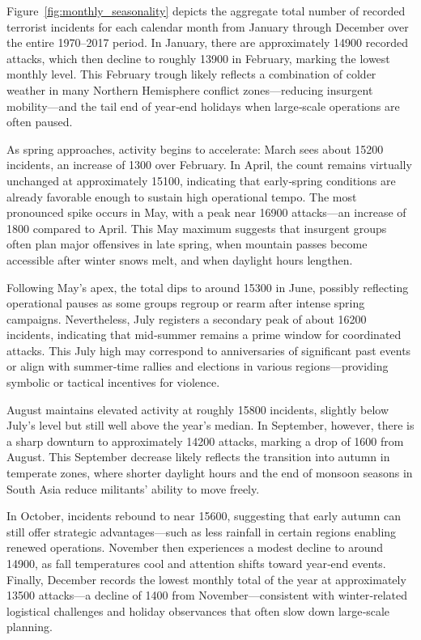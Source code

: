 Figure~\ref{fig:monthly_seasonality} depicts the aggregate total number of recorded terrorist incidents for each calendar month from January through December over the entire 1970–2017 period. In January, there are approximately 14900 recorded attacks, which then decline to roughly 13900 in February, marking the lowest monthly level. This February trough likely reflects a combination of colder weather in many Northern Hemisphere conflict zones—reducing insurgent mobility—and the tail end of year‐end holidays when large‐scale operations are often paused. 

As spring approaches, activity begins to accelerate: March sees about 15200 incidents, an increase of 1300 over February. In April, the count remains virtually unchanged at approximately 15100, indicating that early‐spring conditions are already favorable enough to sustain high operational tempo. The most pronounced spike occurs in May, with a peak near 16900 attacks—an increase of 1800 compared to April. This May maximum suggests that insurgent groups often plan major offensives in late spring, when mountain passes become accessible after winter snows melt, and when daylight hours lengthen. 

Following May’s apex, the total dips to around 15300 in June, possibly reflecting operational pauses as some groups regroup or rearm after intense spring campaigns. Nevertheless, July registers a secondary peak of about 16200 incidents, indicating that mid‐summer remains a prime window for coordinated attacks. This July high may correspond to anniversaries of significant past events or align with summer‐time rallies and elections in various regions—providing symbolic or tactical incentives for violence.

August maintains elevated activity at roughly 15800 incidents, slightly below July’s level but still well above the year’s median. In September, however, there is a sharp downturn to approximately 14200 attacks, marking a drop of 1600 from August. This September decrease likely reflects the transition into autumn in temperate zones, where shorter daylight hours and the end of monsoon seasons in South Asia reduce militants’ ability to move freely. 

In October, incidents rebound to near 15600, suggesting that early autumn can still offer strategic advantages—such as less rainfall in certain regions enabling renewed operations. November then experiences a modest decline to around 14900, as fall temperatures cool and attention shifts toward year‐end events. Finally, December records the lowest monthly total of the year at approximately 13500 attacks—a decline of 1400 from November—consistent with winter‐related logistical challenges and holiday observances that often slow down large‐scale planning.

